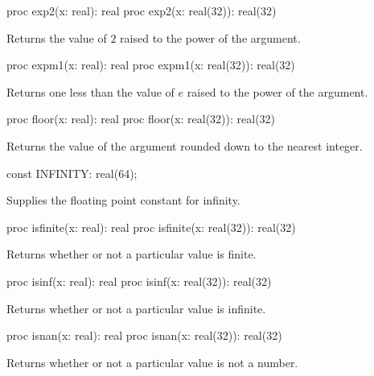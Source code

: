 \begin{protohead}
proc exp2(x: real): real
proc exp2(x: real(32)): real(32)
\end{protohead}
\begin{protobody}
Returns the value of $2$ raised to the power of the argument.
\end{protobody}

\begin{protohead}
proc expm1(x: real): real
proc expm1(x: real(32)): real(32)
\end{protohead}
\begin{protobody}
Returns one less than the value of $e$ raised to the power of the argument.
\end{protobody}

\begin{protohead}
proc floor(x: real): real
proc floor(x: real(32)): real(32)
\end{protohead}
\begin{protobody}
Returns the value of the argument rounded down to the nearest integer.
\end{protobody}

\begin{protohead}
const INFINITY: real(64);
\end{protohead}
\begin{protobody}
Supplies the floating point constant for infinity.
\end{protobody}

\begin{protohead}
proc isfinite(x: real): real
proc isfinite(x: real(32)): real(32)
\end{protohead}
\begin{protobody}
Returns whether or not a particular value is finite.
\end{protobody}

\begin{protohead}
proc isinf(x: real): real
proc isinf(x: real(32)): real(32)
\end{protohead}
\begin{protobody}
Returns whether or not a particular value is infinite.
\end{protobody}

\begin{protohead}
proc isnan(x: real): real
proc isnan(x: real(32)): real(32)
\end{protohead}
\begin{protobody}
Returns whether or not a particular value is not a number.
\end{protobody}

